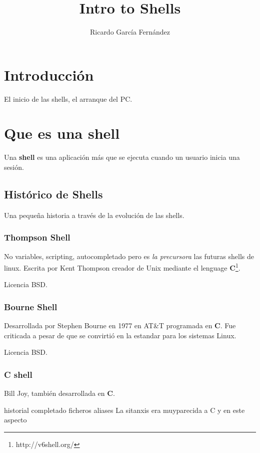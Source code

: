 \documentclass{scrartcl}
\title{\textbf{Intro to Shells}}
\subtitle{}
\author{Ricardo Garc\'ia Fern\'andez}
\begin{document}
\maketitle

\section{Introducci\'on}

El inicio de las shells, el arranque del PC.

\section{Que es una shell}

Una \textbf{shell} es una aplicaci\'on m\'as que se ejecuta cuando un usuario inicia una sesi\'on.

\subsection{Hist\'orico de Shells}

Una peque\~na historia a trav\'es de la evoluci\'on de las shells.

\subsubsection{Thompson Shell}

No variables, scripting, autocompletado pero es \emph{la precursora} las futuras shells de linux.
Escrita por Kent Thompson creador de Unix mediante el lenguage \textbf{C}\footnote{http://v6shell.org/}.

Licencia BSD.

\subsubsection{Bourne Shell}

Desarrollada por Stephen Bourne en 1977 en AT\&T programada en \textbf{C}.
Fue criticada a pesar de que se convirti\'o en la estandar para los sistemas Linux.

Licencia BSD.

\subsubsection{C shell}

Bill Joy, tambi\'en desarrollada en \textbf{C}.

historial
completado ficheros
aliases
La sitanxis era muyparecida a C y en este aspecto 
\end{document}

